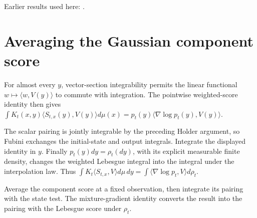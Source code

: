 \documentclass[11pt,a4paper]{article}
\begin{document}
Earlier results used here: \cite[Section~3.37.4]{LangevinLean2026ULASC}.

\section{\texorpdfstring{Averaging the Gaussian component score}{Averaging the Gaussian component score}}


For almost every \(y\), vector-section integrability permits the linear functional \(w\mapsto\langle w,V(y)\rangle\) to commute with integration. The pointwise weighted-score identity then gives \(\int K_t(x,y)\langle S_{t,x}(y),V(y)\rangle d\mu(x)=p_t(y)\langle\nabla\log p_t(y),V(y)\rangle\).



The scalar pairing is jointly integrable by the preceding Holder argument, so Fubini exchanges the initial-state and output integrals. Integrate the displayed identity in \(y\). Finally \(p_t(y)dy=\rho_t(dy)\), with its explicit measurable finite density, changes the weighted Lebesgue integral into the integral under the interpolation law. Thus \(\int K_t\langle S_{t,x},V\rangle d\mu\,dy=\int\langle\nabla\log p_t,V\rangle d\rho_t\).



Average the component score at a fixed observation, then integrate its pairing with the state test. The mixture-gradient identity converts the result into the pairing with the Lebesgue score under \(\rho_t\).
\end{document}
